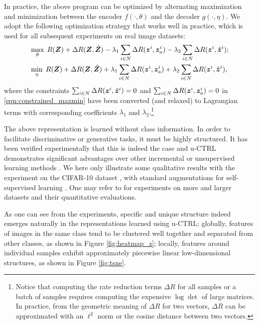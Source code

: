 \documentclass[\toplevelprefix/book-main.tex]{subfiles}
\begin{document}
In practice, the above program can be optimized by alternating maximization and minimization between the encoder $f(\cdot,\theta)$ and the decoder $g(\cdot,\eta)$. We adopt the following optimization strategy that works well in practice, which is used for all subsequent experiments on real image datasets:
\vspace{-1mm}
\begin{align}
  &  \max_{\theta}\; R(\bm{Z}) + \Delta{R(\bm{Z}, \hat{\bm{Z}})-\lambda_{1}\sum_{i\in N} \Delta R(\bm{z}^i, \bm{z}_{a}^i)} -\lambda_{2}\sum_{i\in N} \Delta R(\bm{z}^i, \hat{\bm{z}}^i) \label{eqn:constrained_max}; \\
   & \min_{\eta}\; R(\bm{Z}) + \Delta{R(\bm{Z}, \hat{\bm{Z}})+\lambda_{1}\sum_{i\in N} \Delta R(\bm{z}^i, \bm{z}_{a}^i)+ \lambda_{2}\sum_{i\in N} \Delta R(\bm{z}^i, \hat{\bm{z}}^i)} \label{eqn:constrained_min}, 
\end{align}
where the constraints $\sum_{i\in N} \Delta R(\bm{z}^i, \hat{\bm{z}}^i) = 0$ and $\sum_{i\in N} \Delta R(\bm{z}^i, \bm{z}_{a}^i) = 0$ in \eqref{eqn:constrained_maxmin} have been converted (and relaxed) to Lagrangian terms with corresponding coefficients $\lambda_{1}$ and  $\lambda_{2}$.\footnote{Notice that computing the rate reduction terms $\Delta R$ for all samples or a batch of samples requires computing the expensive $\log\det$ of large matrices. In practice, from the geometric meaning of $\Delta R$ for two vectors, $\Delta R$ can be approximated with an $\ell^2$ norm or the cosine distance between two vectors.}

The above representation is learned without class information. In order to facilitate discriminative or generative tasks, it must be highly structured. It has been verified experimentally that this is indeed the case and u-CTRL demonstrates significant advantages over other incremental or unsupervised learning methods \cite{pmlr-v234-tong24a}. We here only illustrate some qualitative results with the experiment on the CIFAR-10 dataset \cite{krizhevsky2014cifar}, with standard augmentations for self-supervised learning \cite{chen2020simple}. One may refer to \cite{pmlr-v234-tong24a} for experiments on more and larger datasets and their quantitative evaluations. 

As one can see from the experiments, specific and unique structure indeed emerges naturally in the representations learned using u-CTRL: globally, features of images in the same class tend to be clustered well together and separated from other classes, as shown in Figure \ref{fig:heatmap_z}; locally, features around individual samples exhibit approximately piecewise linear low-dimensional structures, as shown in Figure \ref{fig:tsne}. 
\end{document}

